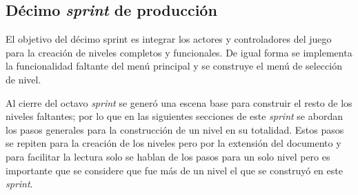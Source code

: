 \subsection{Décimo \textit{sprint} de producción}
El objetivo del décimo sprint es integrar los actores y controladores del juego 
para la creación de niveles completos y funcionales. De igual forma se 
implementa la funcionalidad faltante del menú principal y se construye el menú 
de selección de nivel.
\\
\par
Al cierre del octavo \textit{sprint} se generó una escena base para construir el 
resto de los niveles faltantes; por lo que en las siguientes secciones de este 
\textit{sprint} se abordan los pasos generales para la construcción de un nivel 
en su totalidad. Estos pasos se repiten para la creación de los niveles pero por 
la extensión del documento y para facilitar la lectura solo se hablan de los 
pasos para un solo nivel pero es importante que se considere que fue más de un 
nivel el que se construyó en este \textit{sprint}. 
